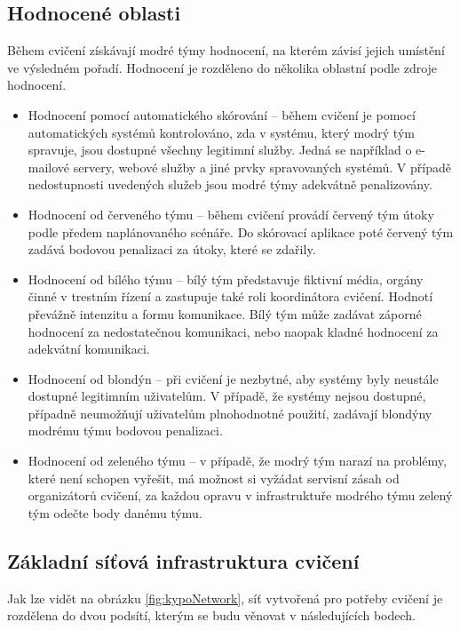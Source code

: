 \documentclass[
  digital, %
  twoside, %
  table,   %
  nolof,     %
  nolot,     %
]{fithesis3}
\begin{document}
\subsection{Hodnocené oblasti}
Během cvičení získávají modré týmy hodnocení, na kterém závisí jejich umístění ve výsledném pořadí. Hodnocení je rozděleno do několika oblastní podle zdroje hodnocení.

\begin{itemize}
\item Hodnocení pomocí automatického skórování -- během cvičení je pomocí automatických systémů kontrolováno, zda v systému, který modrý tým spravuje, jsou dostupné všechny legitimní služby. Jedná se například o e-mailové servery, webové služby a jiné prvky spravovaných systémů. V případě nedostupnosti uvedených služeb jsou modré týmy adekvátně penalizovány.
\item Hodnocení od červeného týmu -- během cvičení provádí červený tým útoky podle předem naplánovaného scénáře. Do skórovací aplikace poté červený tým zadává bodovou penalizaci za útoky, které se zdařily.
\item Hodnocení od bílého týmu -- bílý tým představuje fiktivní média, orgány činné v trestním řízení a zastupuje také roli koordinátora cvičení. Hodnotí převážně intenzitu a formu komunikace. Bílý tým může zadávat záporné hodnocení za nedostatečnou komunikaci, nebo naopak kladné hodnocení za adekvátní komunikaci.
\item Hodnocení od blondýn -- při cvičení je nezbytné, aby systémy byly neustále dostupné legitimním uživatelům. V případě, že systémy nejsou dostupné, případně neumožňují uživatelům plnohodnotné použití, zadávají blondýny modrému týmu bodovou penalizaci.
\item Hodnocení od zeleného týmu -- v případě, že modrý tým narazí na problémy, které není schopen vyřešit, má možnost si vyžádat servisní zásah od organizátorů cvičení, za každou opravu v infrastruktuře modrého týmu zelený tým odečte body danému týmu.
\end{itemize}

\subsection{Základní síťová infrastruktura cvičení}
Jak lze vidět na obrázku \ref{fig:kypoNetwork}, síť vytvořená pro potřeby cvičení je rozdělena do dvou podsítí, kterým se budu věnovat v následujících bodech.
\end{document}
